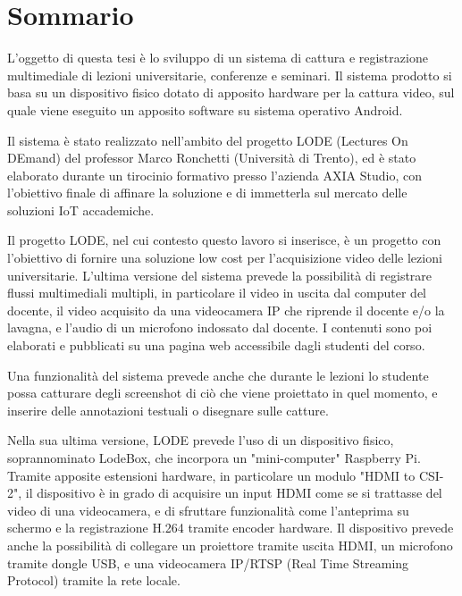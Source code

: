 \chapter*{Sommario} %
\label{sommario}


L'oggetto di questa tesi è lo sviluppo di un sistema di cattura e registrazione multimediale di lezioni universitarie, conferenze e seminari. Il sistema prodotto si basa su un dispositivo fisico dotato di apposito hardware per la cattura video, sul quale viene eseguito un apposito software su sistema operativo Android.

Il sistema è stato realizzato nell'ambito del progetto LODE (Lectures On DEmand) del professor Marco Ronchetti (Università di Trento), ed è stato elaborato durante un tirocinio formativo presso l'azienda AXIA Studio, con l'obiettivo finale di affinare la soluzione e di immetterla sul mercato delle soluzioni IoT accademiche.

Il progetto LODE, nel cui contesto questo lavoro si inserisce, è un progetto con l'obiettivo di fornire una soluzione low cost per l'acquisizione video delle lezioni universitarie. L'ultima versione del sistema prevede la possibilità di registrare flussi multimediali multipli, in particolare il video in uscita dal computer del docente, il video acquisito da una videocamera IP che riprende il docente e/o la lavagna, e l'audio di un microfono indossato dal docente. I contenuti sono poi elaborati e pubblicati su una pagina web accessibile dagli studenti del corso.

Una funzionalità del sistema prevede anche che durante le lezioni lo studente possa catturare degli screenshot di ciò che viene proiettato in quel momento, e inserire delle annotazioni testuali o disegnare sulle catture.

Nella sua ultima versione, LODE prevede l'uso di un dispositivo fisico, soprannominato LodeBox, che incorpora un "mini-computer" Raspberry Pi. Tramite apposite estensioni hardware, in particolare un modulo "HDMI to CSI-2", il dispositivo è in grado di acquisire un input HDMI come se si trattasse del video di una videocamera, e di sfruttare funzionalità come l'anteprima su schermo e la registrazione H.264 tramite encoder hardware. Il dispositivo prevede anche la possibilità di collegare un proiettore tramite uscita HDMI, un microfono tramite dongle USB, e una videocamera IP/RTSP (Real Time Streaming Protocol) tramite la rete locale.

